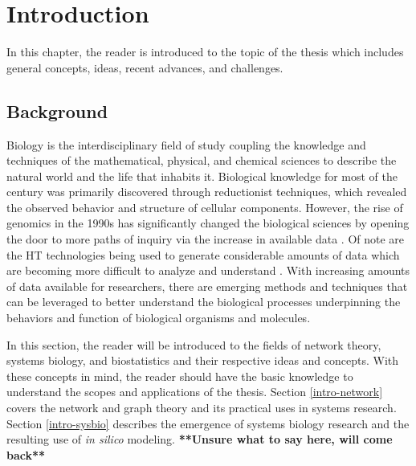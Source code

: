 
\chapter{Introduction}
\bigskip

In this chapter, the reader is introduced to the topic of the thesis which includes general concepts, ideas, recent advances, and challenges.

\section{Background}\label{intro-background}

Biology is the interdisciplinary field of study coupling the knowledge and techniques of the mathematical, physical, and chemical sciences to describe the natural world and the life that inhabits it. Biological knowledge for most of the  century was primarily discovered through reductionist techniques, which revealed the observed behavior and structure of cellular components. However, the rise of genomics in the 1990s has significantly changed the biological sciences by opening the door to more paths of inquiry via the increase in available data \citep{Palsson2000}. Of note are the \acrfull{HT} technologies being used to generate considerable amounts of data which are becoming more difficult to analyze and understand \citep{Sboner2011}. With increasing amounts of data available for researchers, there are emerging methods and techniques that can be leveraged to better understand the biological processes underpinning the behaviors and function of biological organisms and molecules.

In this section, the reader will be introduced to the fields of network theory,  systems biology,  and biostatistics and their respective ideas and concepts. With these concepts in mind, the reader should have the basic knowledge to understand the scopes and applications of the thesis. Section \ref{intro-network} covers the network and graph theory and its practical uses in systems research. Section \ref{intro-sysbio} describes the emergence of systems biology research and the resulting use of \textit{in silico} modeling. %
\textbf{**Unsure what to say here, will come back**}




